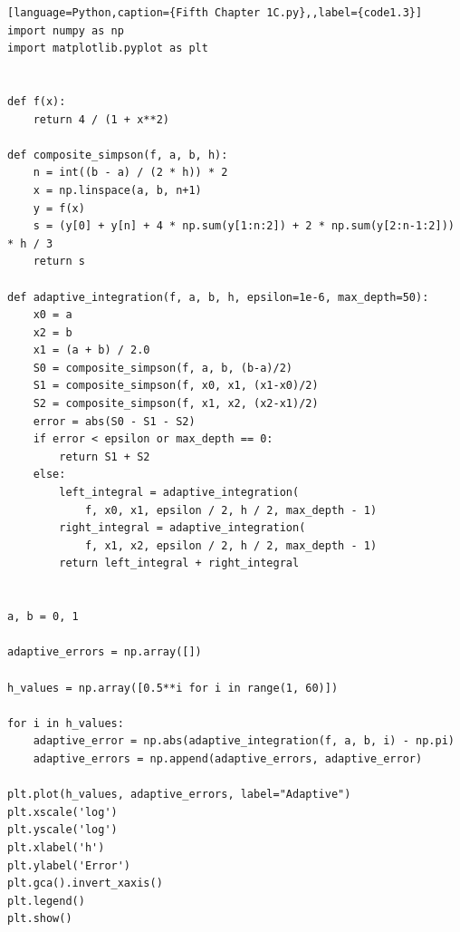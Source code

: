 \documentclass[a4paper,11pt,notitlepage]{article}
\begin{document}
\begin{lstlisting}[language=Python,caption={Fifth Chapter 1C.py},,label={code1.3}]
import numpy as np
import matplotlib.pyplot as plt


def f(x):
    return 4 / (1 + x**2)

def composite_simpson(f, a, b, h):
    n = int((b - a) / (2 * h)) * 2
    x = np.linspace(a, b, n+1)
    y = f(x)
    s = (y[0] + y[n] + 4 * np.sum(y[1:n:2]) + 2 * np.sum(y[2:n-1:2])) * h / 3
    return s

def adaptive_integration(f, a, b, h, epsilon=1e-6, max_depth=50):
    x0 = a
    x2 = b
    x1 = (a + b) / 2.0
    S0 = composite_simpson(f, a, b, (b-a)/2)
    S1 = composite_simpson(f, x0, x1, (x1-x0)/2)
    S2 = composite_simpson(f, x1, x2, (x2-x1)/2)
    error = abs(S0 - S1 - S2)
    if error < epsilon or max_depth == 0:
        return S1 + S2
    else:
        left_integral = adaptive_integration(
            f, x0, x1, epsilon / 2, h / 2, max_depth - 1)
        right_integral = adaptive_integration(
            f, x1, x2, epsilon / 2, h / 2, max_depth - 1)
        return left_integral + right_integral


a, b = 0, 1

adaptive_errors = np.array([])

h_values = np.array([0.5**i for i in range(1, 60)])

for i in h_values:
    adaptive_error = np.abs(adaptive_integration(f, a, b, i) - np.pi)
    adaptive_errors = np.append(adaptive_errors, adaptive_error)

plt.plot(h_values, adaptive_errors, label="Adaptive")
plt.xscale('log')
plt.yscale('log')
plt.xlabel('h')
plt.ylabel('Error')
plt.gca().invert_xaxis()
plt.legend()
plt.show()    
\end{lstlisting}
\end{document}
